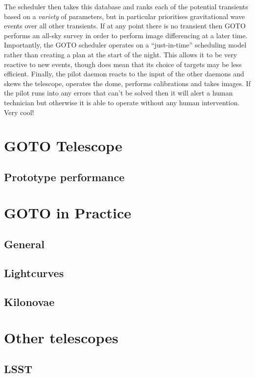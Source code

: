 \documentclass[twocolumn]{aastex631}
\newcommand{\placeholder}[1]{{\color{gray} \lipsum[#1]}}
\begin{document}
The scheduler then takes this database and ranks each of the potential transients based on a \textit{variety} of parameters, but in particular prioritises gravitational wave events over all other transients. If at any point there is no transient then GOTO performs an all-sky survey in order to perform image differencing at a later time. Importantly, the GOTO scheduler operates on a ``just-in-time'' scheduling model rather than creating a plan at the start of the night. This allows it to be very reactive to new events, though does mean that its choice of targets may be less efficient. Finally, the pilot daemon reacts to the input of the other daemons and skews the telescope, operates the dome, performs calibrations and takes images. If the pilot runs into any errors that can't be solved then it will alert a human technician but otherwise it is able to operate without any human intervention. Very cool!

\section{GOTO Telescope}
\subsection{Prototype performance}
\citet{Steeghs+2022}
\placeholder{3}

\subsection{}
\citet{GOTO+2020}
\placeholder{4}

\section{GOTO in Practice}
\subsection{General}
\citet{Gompertz+2020}
\placeholder{5}

\subsection{Lightcurves}
\citet{Burhanudin+2021}
\placeholder{6}

\subsection{Kilonovae}
\citet{Chase+2022}
\placeholder{7}

\section{Other telescopes}
\subsection{LSST}
\citet{Andreoni+2022}
\placeholder{8}


{}
\end{document}
